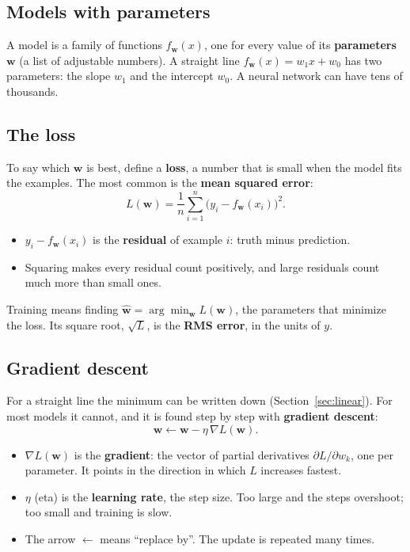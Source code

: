 \documentclass[11pt]{article}
\begin{document}
\subsection{Models with parameters}
A model is a family of functions $f_{\bm w}(x)$, one for every value of its \textbf{parameters} $\bm w$ (a list of adjustable
numbers). A straight line $f_{\bm w}(x) = w_1 x + w_0$ has two parameters: the slope $w_1$ and the intercept $w_0$. A neural
network can have tens of thousands.

\subsection{The loss}
To say which $\bm w$ is best, define a \textbf{loss}, a number that is small when the model fits the examples. The most common
is the \textbf{mean squared error}:
\begin{equation}
L(\bm w) = \frac1n\sum_{i=1}^{n}\bigl(y_i - f_{\bm w}(x_i)\bigr)^2 .
\label{eq:mse}
\end{equation}
\begin{itemize}
\item $y_i - f_{\bm w}(x_i)$ is the \textbf{residual} of example $i$: truth minus prediction.
\item Squaring makes every residual count positively, and large residuals count much more than small ones.
\end{itemize}
Training means finding $\hat{\bm w} = \arg\min_{\bm w} L(\bm w)$, the parameters that minimize the loss. Its square root,
$\sqrt{L}$, is the \textbf{RMS error}, in the units of $y$.

\subsection{Gradient descent}
For a straight line the minimum can be written down (Section~\ref{sec:linear}). For most models it cannot, and it is found
step by step with \textbf{gradient descent}:
\begin{equation}
\bm w \leftarrow \bm w - \eta\,\nabla L(\bm w).
\label{eq:gd}
\end{equation}
\begin{itemize}
\item $\nabla L(\bm w)$ is the \textbf{gradient}: the vector of partial derivatives $\partial L/\partial w_k$, one per parameter.
  It points in the direction in which $L$ increases fastest.
\item $\eta$ (eta) is the \textbf{learning rate}, the step size. Too large and the steps overshoot; too small and training is slow.
\item The arrow $\leftarrow$ means ``replace by''. The update is repeated many times.
\end{itemize}
\end{document}
